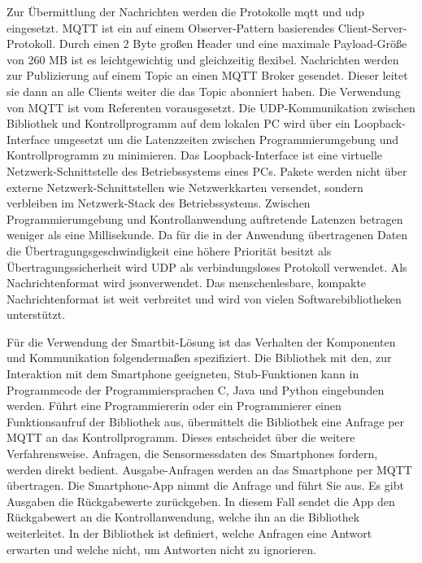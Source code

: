 \documentclass[11pt,a4paper]{report}
\begin{document}
Zur Übermittlung der Nachrichten werden die Protokolle \acrfull{mqtt} und \acrfull{udp} eingesetzt.
MQTT ist ein auf einem Observer-Pattern basierendes Client-Server-Protokoll.
Durch einen 2 Byte großen Header und eine maximale Payload-Größe von 260 MB ist es leichtgewichtig und gleichzeitig flexibel.
Nachrichten werden zur Publizierung auf einem Topic an einen MQTT Broker gesendet.
Dieser leitet sie dann an alle Clients weiter die das Topic abonniert haben.
Die Verwendung von MQTT ist vom Referenten vorausgesetzt.
Die UDP-Kommunikation zwischen Bibliothek und Kontrollprogramm auf dem lokalen PC wird über ein Loopback-Interface umgesetzt um die Latenzzeiten zwischen Programmierumgebung und Kontrollprogramm zu minimieren.
Das Loopback-Interface ist eine virtuelle Netzwerk-Schnittstelle des Betriebssystems eines PCs.
Pakete werden nicht über externe Netzwerk-Schnittstellen wie Netzwerkkarten versendet, sondern verbleiben im Netzwerk-Stack des Betriebssystems.
Zwischen Programmierumgebung und Kontrollanwendung auftretende Latenzen betragen weniger als eine Millisekunde.
Da für die in der Anwendung übertragenen Daten die Übertragungsgeschwindigkeit eine höhere Priorität besitzt als Übertragungssicherheit wird UDP als verbindungsloses Protokoll verwendet.
Als Nachrichtenformat wird \acrfull{json}verwendet.
Das menschenlesbare, kompakte Nachrichtenformat ist weit verbreitet und wird von vielen Softwarebibliotheken unterstützt.

Für die Verwendung der Smartbit-Lösung ist das Verhalten der Komponenten und Kommunikation folgendermaßen spezifiziert.
Die Bibliothek mit den, zur Interaktion mit dem Smartphone geeigneten, Stub-Funktionen kann in Programmcode der Programmiersprachen C, Java und Python eingebunden werden.
Führt eine Programmiererin oder ein Programmierer einen Funktionsaufruf der Bibliothek aus, übermittelt die Bibliothek eine Anfrage per MQTT an das Kontrollprogramm.
Dieses entscheidet über die weitere Verfahrensweise.
Anfragen, die Sensormessdaten des Smartphones fordern, werden direkt bedient.
Ausgabe-Anfragen werden an das Smartphone per MQTT übertragen.
Die Smartphone-App nimmt die Anfrage und führt Sie aus.
Es gibt Ausgaben die Rückgabewerte zurückgeben.
In diesem Fall sendet die App den Rückgabewert an die Kontrollanwendung, welche ihn an die Bibliothek weiterleitet.
In der Bibliothek ist definiert, welche Anfragen eine Antwort erwarten und welche nicht, um Antworten nicht zu ignorieren.
\end{document}
